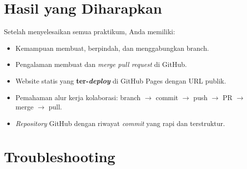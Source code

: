\section{Hasil yang Diharapkan}
\label{sec:pr-hasil}

Setelah menyelesaikan semua praktikum, Anda memiliki:
\begin{itemize}
  \item Kemampuan membuat, berpindah, dan menggabungkan branch.
  \item Pengalaman membuat dan \emph{merge pull request} di GitHub.
  \item Website statis yang \textbf{ter-\emph{deploy}} di GitHub Pages dengan URL publik.
  \item Pemahaman alur kerja kolaborasi: branch $\rightarrow$ commit $\rightarrow$ push $\rightarrow$ PR $\rightarrow$ merge $\rightarrow$ pull.
  \item \emph{Repository} GitHub dengan riwayat \emph{commit} yang rapi dan terstruktur.
\end{itemize}

\section{Troubleshooting}
\label{sec:pr-trouble}

